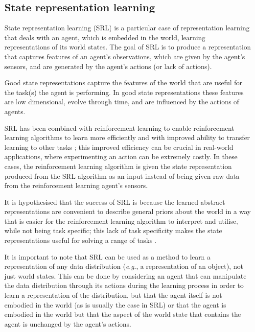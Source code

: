 \subsection{State representation learning}

State representation learning (SRL) is a particular case of representation learning that deals with an agent, which is embedded in the world, learning representations of its world states.
The goal of SRL is to produce a representation that captures features of an agent's observations, which are given by the agent's sensors, and are generated by the agent's actions (or lack of actions).

Good state representations capture the features of the world that are useful for the task(s) the agent is performing.
In good state representations these features are low dimensional, evolve through time, and are influenced by the actions of agents.

SRL has been combined with reinforcement learning to enable reinforcement learning algorithms to learn more efficiently and with improved ability to transfer learning to other tasks \autocite{Munk2016}; this improved efficiency can be crucial in real-world applications, where experimenting an action can be extremely costly.
In these cases, the reinforcement learning algorithm is given the state representation produced from the SRL algorithm as an input instead of being given raw data from the reinforcement learning agent's sensors.

It is hypothesised that the success of SRL is because the learned abstract representations are convenient to describe general priors about the world in a way that is easier for the reinforcement learning algorithm to interpret and utilise, while not being task specific; this lack of task specificity makes the state representations useful for solving a range of tasks \autocite{Bengio2013}.

It is important to note that SRL can be used as a method to learn a representation of any data distribution (\textit{e.g.}, a representation of an object), not just world states.
This can be done by considering an agent that can manipulate the data distribution through its actions during the learning process in order to learn a representation of the distribution, but that the agent itself is not embodied in the world (as is usually the case in SRL) or that the agent is embodied in the world but that the aspect of the world state that contains the agent is unchanged by the agent's actions.

